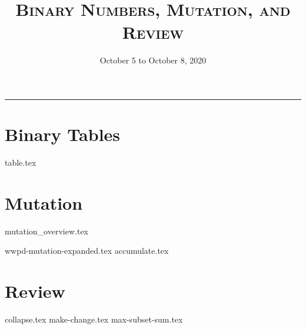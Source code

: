 \documentclass{exam}
\title{\textsc{Binary Numbers, Mutation, and Review}}
\date{October 5 to October 8, 2020}
\begin{document}
\maketitle
\rule{\textwidth}{0.15em}
\fontsize{12}{15}\selectfont

\section{Binary Tables}
\begin{questions}
{table.tex}
\end{questions}

\newpage
\section{Mutation}
{mutation_overview.tex}
\begin{questions}
{wwpd-mutation-expanded.tex}
\newpage
\newpage
{accumulate.tex}
\end{questions}

\newpage
\section{Review}
\begin{questions}
{collapse.tex}
\newpage
{make-change.tex}
\newpage
{max-subset-sum.tex}
\end{questions}
\end{document}
